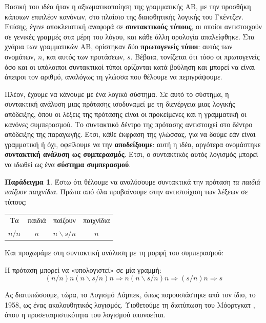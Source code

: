 \documentclass [a4paper,11pt] {book}
\theoremstyle{definition}
\newtheorem{example}[theorem]{Παράδειγμα}
\theoremstyle{definition}
\begin{document}
Βασική του ιδέα ήταν η αξιωματικοποίηση της γραμματικής ΑΒ, με την προσθήκη κάποιων επιπλέον κανόνων, στο πλαίσιο της διαισθητικής λογικής του Γκέντζεν. Επίσης, έγινε αποκλειστική αναφορά σε \textbf{συντακτικούς τύπους}, οι οποίοι αντιστοιχούν σε γενικές γραμμές στα μέρη του λόγου, και κάθε άλλη ορολογία απαλείφθηκε. Στα χνάρια των γραμματικών ΑΒ, ορίστηκαν δύο \textbf{πρωτογενείς τύποι}: αυτός των ονομάτων, $n$, και αυτός των προτάσεων, $s$. Βέβαια, τονίζεται ότι τόσο οι πρωτογενείς όσο και οι υπόλοιποι συντακτικοί τύποι ορίζονται κατά βούληση και μπορεί να είναι άπειροι τον αριθμό, αναλόγως τη γλώσσα που θέλουμε να περιγράψουμε.


Πλέον, έχουμε να κάνουμε με ένα λογικό σύστημα. Σε αυτό το σύστημα, η συντακτική ανάλυση μιας πρότασης ισοδυναμεί με τη διενέργεια μιας λογικής απόδειξης, όπου οι λέξεις της πρότασης είναι οι προκείμενες και η γραμματική οι κανόνες συμπερασμού. Το συντακτικό δέντρο της πρότασης αντιστοιχεί στο δέντρο απόδειξης της παραγωγής. Έτσι, κάθε έκφραση της γλώσσας, για να δούμε εάν είναι γραμματική ή όχι, οφείλουμε να την \textbf{αποδείξουμε}: αυτή η ιδέα, αργότερα ονομάστηκε \textbf{συντακτική ανάλυση ως συμπερασμός}. Έτσι, ο συντακτικός αυτός λογισμός μπορεί να ιδωθεί ως ένα \textbf{σύστημα συμπερασμού}.
\begin{example}
Έστω ότι θέλουμε να αναλύσουμε συντακτικά την πρόταση \textit{τα παιδιά παίζουν παιχνίδια}. Πρώτα από όλα προβαίνουμε στην αντιστοίχιση των λέξεων σε τύπους:
\begin{center}
\begin{tabular}{cccc}
Τα & παιδιά & παίζουν & παιχνίδια \\ 
$n/n$ & $n$ & $n\backslash s/n$ & $n$ \\ 
\end{tabular}
\end{center}
Και προχωράμε στη συντακτική ανάλυση με τη μορφή του συμπερασμού:
\begin{prooftree}
\end{prooftree}
Η πρόταση μπορεί να «υπολογιστεί» σε μία γραμμή:
\begin{equation*}
(n/n)n(n\backslash s/n)n \Rightarrow n(n\backslash s/n)n\Rightarrow (s/n)n\Rightarrow s
\end{equation*}
\end{example}
Ας διατυπώσουμε, τώρα, το Λογισμό Λάμπεκ, όπως παρουσιάστηκε από τον ίδιο, το 1958, ως ένας ακολουθητικός λογισμός. Υιοθετούμε τη διατύπωση του Μόορτγκατ \cite{Moor:97}, όπου η προσεταιριστικότητα του λογισμού υπονοείται.
\end{document}
